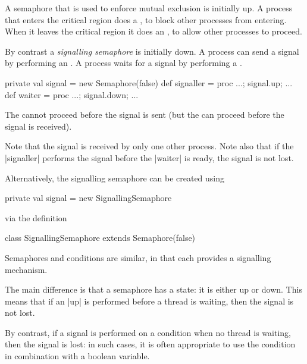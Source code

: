 
\begin{slide}

A semaphore that is used to enforce mutual exclusion is initially up.  A
process that enters the critical region does a , to block other
processes from entering.  When it leaves the critical region it does an
, to allow other processes to proceed.
\end{slide}



\begin{slide}

By contrast a \emph{signalling semaphore} is initially down.  A process can
send a signal by performing an .  A process waits for a signal by
performing a .
\begin{scala}
private val signal = new Semaphore(false)
def signaller = proc{ ...; signal.up; ... }
def waiter = proc{ ...; signal.down; ... }
\end{scala}  
The  cannot proceed before the signal is sent (but the
 can proceed before the signal is received).

Note that the signal is received by only one other process.  Note also that if
the |signaller| performs the signal before the |waiter| is ready, the signal
is not lost.
\end{slide}


\begin{slide}

Alternatively, the signalling semaphore can be created using
\begin{scala}
private val signal = new SignallingSemaphore
\end{scala}
via the definition
\begin{scala}
class SignallingSemaphore extends Semaphore(false)
\end{scala}
\end{slide}


\begin{slide}

Semaphores and conditions are similar, in that each provides a signalling
mechanism.

The main difference is that a semaphore has a state: it is either up or down.
This means that if an |up| is performed before a thread is waiting, then the
signal is not lost.  

By contrast, if a signal is performed on a condition when
no thread is waiting, then the signal is lost: in such cases, it is often
appropriate to use the condition in combination with a boolean variable. 
\end{slide}

